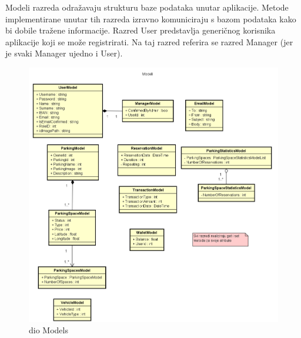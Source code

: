 			{Modeli razreda odražavaju strukturu baze podataka unutar aplikacije. Metode implementirane unutar tih razreda izravno komuniciraju s bazom podataka kako bi dobile tražene informacije. Razred User predstavlja generičnog korisnika aplikacije koji se može registrirati. Na taj razred referira se razred Manager (jer je svaki Manager ujedno i User).}
			
			\begin{figure}[h]
				\centering
				\includegraphics[width=\textwidth,keepaspectratio]{slike/progi_1.png}
				\caption{dio Models}
				\label{fig:models}
			\end{figure}
			\eject
		
